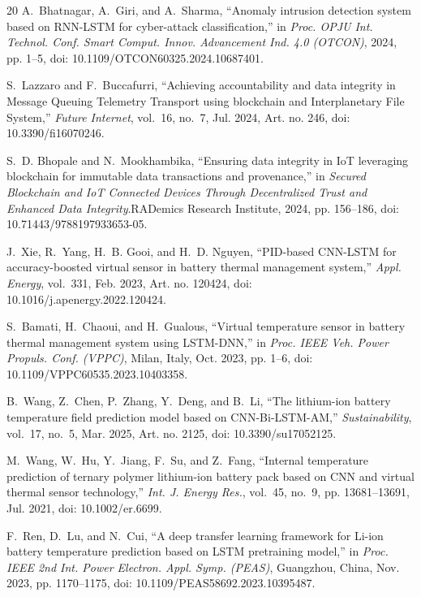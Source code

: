 \documentclass[conference]{IEEEtran}
\begin{document}
\begin{thebibliography}{20}
A.~Bhatnagar, A.~Giri, and A.~Sharma, ``Anomaly intrusion detection system based on RNN-LSTM for cyber-attack classification,'' in \emph{Proc. OPJU Int. Technol. Conf. Smart Comput. Innov. Advancement Ind. 4.0 (OTCON)}, 2024, pp. 1--5, doi: 10.1109/OTCON60325.2024.10687401.

S.~Lazzaro and F.~Buccafurri, ``Achieving accountability and data integrity in Message Queuing Telemetry Transport using blockchain and Interplanetary File System,'' \emph{Future Internet}, vol.~16, no.~7, Jul. 2024, Art. no. 246, doi: 10.3390/fi16070246.

S.~D. Bhopale and N.~Mookhambika, ``Ensuring data integrity in IoT leveraging blockchain for immutable data transactions and provenance,'' in \emph{Secured Blockchain and IoT Connected Devices Through Decentralized Trust and Enhanced Data Integrity}.\hspace{1em}RADemics Research Institute, 2024, pp. 156--186, doi: 10.71443/9788197933653-05.

J.~Xie, R.~Yang, H.~B. Gooi, and H.~D. Nguyen, ``PID-based CNN-LSTM for accuracy-boosted virtual sensor in battery thermal management system,'' \emph{Appl. Energy}, vol.~331, Feb. 2023, Art. no. 120424, doi: 10.1016/j.apenergy.2022.120424.

S.~Bamati, H.~Chaoui, and H.~Gualous, ``Virtual temperature sensor in battery thermal management system using LSTM-DNN,'' in \emph{Proc. IEEE Veh. Power Propuls. Conf. (VPPC)}, Milan, Italy, Oct. 2023, pp. 1--6, doi: 10.1109/VPPC60535.2023.10403358.

B.~Wang, Z.~Chen, P.~Zhang, Y.~Deng, and B.~Li, ``The lithium-ion battery temperature field prediction model based on CNN-Bi-LSTM-AM,'' \emph{Sustainability}, vol.~17, no.~5, Mar. 2025, Art. no. 2125, doi: 10.3390/su17052125.

M.~Wang, W.~Hu, Y.~Jiang, F.~Su, and Z.~Fang, ``Internal temperature prediction of ternary polymer lithium-ion battery pack based on CNN and virtual thermal sensor technology,'' \emph{Int. J. Energy Res.}, vol.~45, no.~9, pp. 13681--13691, Jul. 2021, doi: 10.1002/er.6699.

F.~Ren, D.~Lu, and N.~Cui, ``A deep transfer learning framework for Li-ion battery temperature prediction based on LSTM pretraining model,'' in \emph{Proc. IEEE 2nd Int. Power Electron. Appl. Symp. (PEAS)}, Guangzhou, China, Nov. 2023, pp. 1170--1175, doi: 10.1109/PEAS58692.2023.10395487.


\end{thebibliography}
\end{document}
